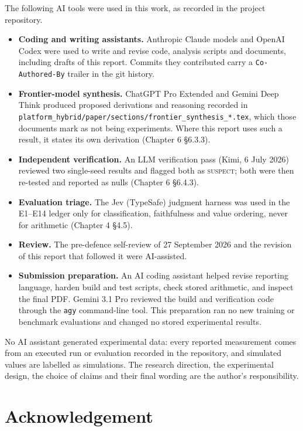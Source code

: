 The following AI tools were used in this work, as recorded in the project
repository.

\begin{itemize}
\item \textbf{Coding and writing assistants.} Anthropic Claude models and
OpenAI Codex were used to write and revise code, analysis scripts and
documents, including drafts of this report. Commits they contributed carry a
\texttt{Co-Authored-By} trailer in the git history.
\item \textbf{Frontier-model synthesis.} ChatGPT Pro Extended and Gemini Deep
Think produced proposed derivations and reasoning recorded in
\texttt{platform\_hybrid/paper/sections/frontier\_synthesis\_*.tex}, which those
documents mark as not being experiments. Where this report uses such a result,
it states its own derivation (Chapter 6 \S6.3.3).
\item \textbf{Independent verification.} An LLM verification pass (Kimi,
6 July 2026) reviewed two single-seed results and flagged both as
\textsc{suspect}; both were then re-tested and reported as nulls (Chapter 6
\S6.4.3).
\item \textbf{Evaluation triage.} The Jev (TypeSafe) judgment harness was used
in the E1--E14 ledger only for classification, faithfulness and value
ordering, never for arithmetic (Chapter 4 \S4.5).
\item \textbf{Review.} The pre-defence self-review of 27 September 2026 and the
revision of this report that followed it were AI-assisted.
\item \textbf{Submission preparation.} An AI coding assistant helped revise
reporting language, harden build and test scripts, check stored arithmetic,
and inspect the final PDF. Gemini 3.1 Pro reviewed the build and verification
code through the \texttt{agy} command-line tool. This preparation ran no new
training or benchmark evaluations and changed no stored experimental results.
\end{itemize}

No AI assistant generated experimental data: every reported measurement comes
from an executed run or evaluation recorded in the repository, and simulated
values are labelled as simulations. The research direction,
the experimental design, the choice of claims and their final wording are the
author's responsibility.

\chapter*{Acknowledgement}
\thispagestyle{plain}

